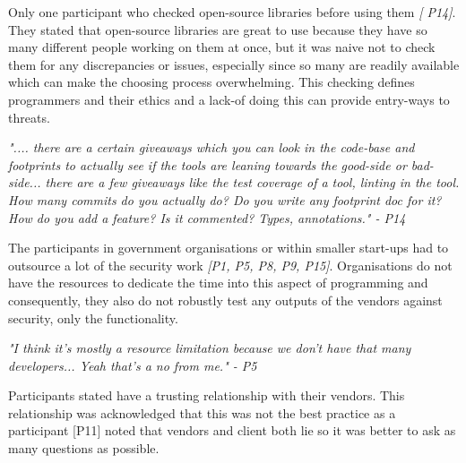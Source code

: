 \newline
\par
Only one participant who checked open-source libraries before using them \textit{[ P14]}. They stated that open-source libraries are great to use because they have so many different people working on them at once, but it was naive not to check them for any discrepancies or issues, especially since so many are readily available which can make the choosing process overwhelming. This checking defines programmers and their ethics and a lack-of doing this can provide entry-ways to threats.
\newline
\par
\textit{".... there are a certain giveaways which you can look in  the code-base and footprints to actually see if the tools are leaning towards the good-side or bad-side... there are a few giveaways like the test coverage of a tool, linting in the tool. How many commits do you actually do? Do you write any footprint doc for it? How do you add a feature? Is it commented? Types, annotations." - P14}
\newline
\par 
The participants in government organisations or within smaller start-ups had to outsource a lot of the security work \textit{[P1, P5, P8, P9, P15]}. Organisations do not have the resources to dedicate the time into this aspect of programming and consequently, they also do not robustly test any outputs of the vendors against security, only the functionality. 
\newline
\par 
\textit{"I think it's mostly a resource limitation because we don't have that many developers... Yeah that's a no from me." - P5}
\newline
\par
Participants stated have a trusting relationship with their vendors. This relationship was acknowledged that this was not the best practice as a participant [P11] noted that vendors and client both lie so it was better to ask as many questions as possible. 
\newline
\par 
